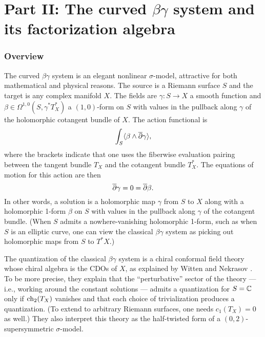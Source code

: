 \newpage

\part*{Part II: The curved $\beta\gamma$ system and its factorization algebra}


\section{Overview}

The curved $\beta\gamma$ system is an elegant nonlinear $\sigma$-model,
attractive for both mathematical and physical reasons.
The source is a Riemann surface $S$ and the target is any complex manifold $X$.
The fields are $\gamma: S \to X$ a smooth function and 
$\beta \in \Omega^{1,0}(S,\gamma^*T^*_X)$ a $(1,0)$-form on $S$ 
with values in the pullback along $\gamma$ of the holomorphic cotangent bundle of $X$.
The action functional is 
\[\int_S \langle \beta \wedge \overline{\partial} \gamma \rangle, \]
where the brackets indicate that one uses the fiberwise evaluation pairing between the tangent bundle $T_X$ and the cotangent bundle $T^*_X$.
The equations of motion for this action are then
\[ 
\overline{\partial} \gamma = 0 = \overline{\partial} \beta. 
\]
In other words, a solution is a holomorphic map $\gamma$ from $S$ to $X$ along with a holomorphic 1-form $\beta$ on $S$ with values in the pullback along $\gamma$ of the cotangent bundle. 
(When $S$ admits a nowhere-vanishing holomorphic 1-form, such as when $S$ is an elliptic curve,
one can view the classical $\beta\gamma$ system as picking out holomorphic maps from $S$ to $T^*X$.)

The quantization of the classical $\beta\gamma$ system is a chiral conformal field theory whose chiral algebra is the CDOs of $X$,
as explained by Witten \cite{WittenCDO} and Nekrasov \cite{Nek}.
To be more precise, they explain that the ``perturbative'' sector of the 
theory --- i.e., working around the constant solutions --- admits a quantization for $S = \mathbb C$ only if ${\rm ch}_2(T_X)$ vanishes and that each choice of trivialization produces a quantization.
(To extend to arbitrary Riemann surfaces, one needs $c_1(T_X) = 0$ as well.)
They also interpret this theory as the half-twisted form of a $(0,2)$-supersymmetric $\sigma$-model.

